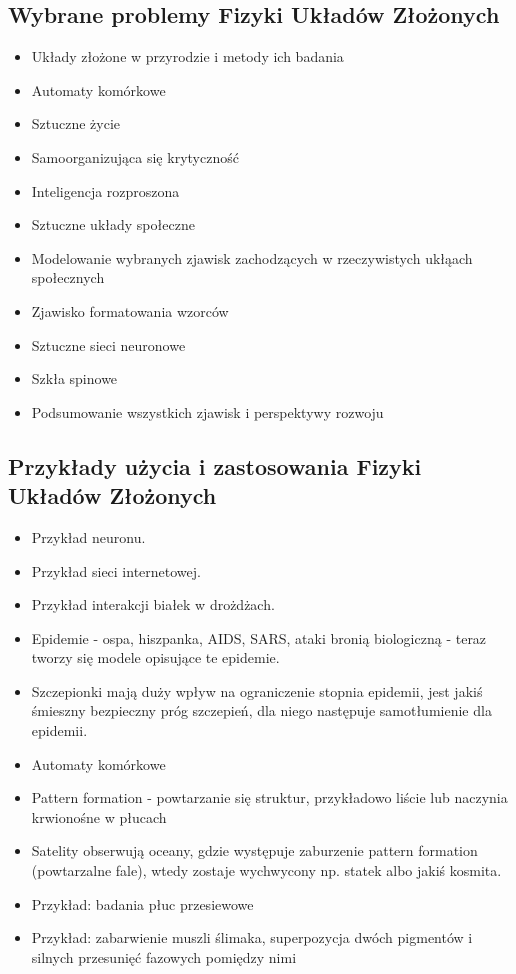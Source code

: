 \documentclass{article}
\begin{document}
		\subsection{Wybrane problemy Fizyki Układów Złożonych}
		\begin{itemize}
			\item Układy złożone w przyrodzie i metody ich badania
			\item Automaty komórkowe
			\item Sztuczne życie
			\item Samoorganizująca się krytyczność
			\item Inteligencja rozproszona
			\item Sztuczne układy społeczne
			\item Modelowanie wybranych zjawisk zachodzących w rzeczywistych ukłąach społecznych
			\item Zjawisko formatowania wzorców
			\item Sztuczne sieci neuronowe
			\item Szkła spinowe
			\item Podsumowanie wszystkich zjawisk i perspektywy rozwoju
		\end{itemize}
	
		\subsection{Przykłady użycia i zastosowania Fizyki Układów Złożonych}	
		\begin{itemize}
			\item Przykład neuronu.
			\item Przykład sieci internetowej.
			\item Przykład interakcji białek w drożdżach.
			\item Epidemie - ospa, hiszpanka, AIDS, SARS, ataki bronią biologiczną - teraz tworzy się modele opisujące te epidemie.
			\item Szczepionki mają duży wpływ na ograniczenie stopnia epidemii, jest jakiś śmieszny bezpieczny próg szczepień, dla niego następuje samotłumienie dla epidemii.
			\item Automaty komórkowe
			\item Pattern formation - powtarzanie się struktur, przykładowo liście lub naczynia krwionośne w płucach
			\item Satelity obserwują oceany, gdzie występuje zaburzenie pattern formation (powtarzalne fale), wtedy zostaje wychwycony np. statek albo jakiś kosmita.
			\item Przykład: badania płuc przesiewowe
			\item Przykład: zabarwienie muszli ślimaka, superpozycja dwóch pigmentów i silnych przesunięć fazowych pomiędzy nimi
		\end{itemize}
\end{document}
